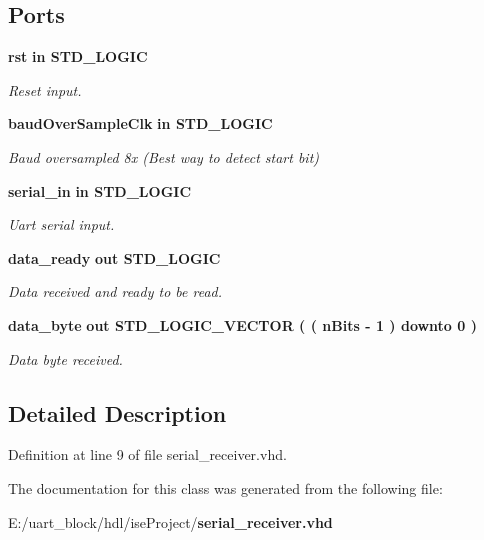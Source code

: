 \subsection*{Ports}
 \begin{DoxyCompactItemize}
\item 
{\bf rst}  {\bfseries {\bfseries in }} {\bfseries S\-T\-D\-\_\-\-L\-O\-G\-I\-C } \label{classserial__receiver_ae085c8310d2bb026ba06982b4ee625ca}

\begin{DoxyCompactList}\small\item\em Reset input. \end{DoxyCompactList}\item 
{\bf baud\-Over\-Sample\-Clk}  {\bfseries {\bfseries in }} {\bfseries S\-T\-D\-\_\-\-L\-O\-G\-I\-C } \label{classserial__receiver_a15f70818a05c91cdc1990eab131f743d}

\begin{DoxyCompactList}\small\item\em Baud oversampled 8x (Best way to detect start bit) \end{DoxyCompactList}\item 
{\bf serial\-\_\-in}  {\bfseries {\bfseries in }} {\bfseries S\-T\-D\-\_\-\-L\-O\-G\-I\-C } \label{classserial__receiver_a387303c39d306a2506581b02f261dc2f}

\begin{DoxyCompactList}\small\item\em Uart serial input. \end{DoxyCompactList}\item 
{\bf data\-\_\-ready}  {\bfseries {\bfseries out }} {\bfseries S\-T\-D\-\_\-\-L\-O\-G\-I\-C } \label{classserial__receiver_ac62bb0a9882c4e28633c87d94f2de2ae}

\begin{DoxyCompactList}\small\item\em Data received and ready to be read. \end{DoxyCompactList}\item 
{\bf data\-\_\-byte}  {\bfseries {\bfseries out }} {\bfseries S\-T\-D\-\_\-\-L\-O\-G\-I\-C\-\_\-\-V\-E\-C\-T\-O\-R (  ( n\-Bits -\/   1  )    downto    0  ) } \label{classserial__receiver_a029d3624d857a6b6355d51475cc7e908}

\begin{DoxyCompactList}\small\item\em Data byte received. \end{DoxyCompactList}\end{DoxyCompactItemize}


\subsection{Detailed Description}


Definition at line 9 of file serial\-\_\-receiver.\-vhd.



The documentation for this class was generated from the following file\-:\begin{DoxyCompactItemize}
\item 
E\-:/uart\-\_\-block/hdl/ise\-Project/{\bf serial\-\_\-receiver.\-vhd}\end{DoxyCompactItemize}
